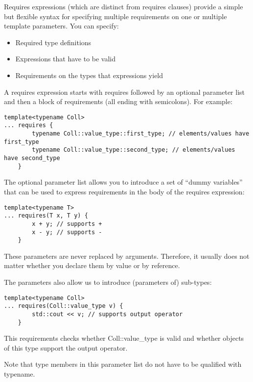 

Requires expressions (which are distinct from requires clauses) provide a simple but flexible syntax for specifying multiple requirements on one or multiple template parameters. You can specify:

\begin{itemize}
\item
Required type definitions

\item
Expressions that have to be valid

\item
Requirements on the types that expressions yield
\end{itemize}

A requires expression starts with requires followed by an optional parameter list and then a block of requirements (all ending with semicolons). For example:

\begin{lstlisting}[style=styleCXX]
template<typename Coll>
... requires {
		typename Coll::value_type::first_type; // elements/values have first_type
		typename Coll::value_type::second_type; // elements/values have second_type
	}
\end{lstlisting}

The optional parameter list allows you to introduce a set of “dummy variables” that can be used to express requirements in the body of the requires expression:

\begin{lstlisting}[style=styleCXX]
template<typename T>
... requires(T x, T y) {
		x + y; // supports +
		x - y; // supports -
	}
\end{lstlisting}

These parameters are never replaced by arguments. Therefore, it usually does not matter whether you declare them by value or by reference.

The parameters also allow us to introduce (parameters of) sub-types:

\begin{lstlisting}[style=styleCXX]
template<typename Coll>
... requires(Coll::value_type v) {
		std::cout << v; // supports output operator
	}
\end{lstlisting}

This requirements checks whether Coll::value\_type is valid and whether objects of this type support the output operator.

Note that type members in this parameter list do not have to be qualified with typename.

